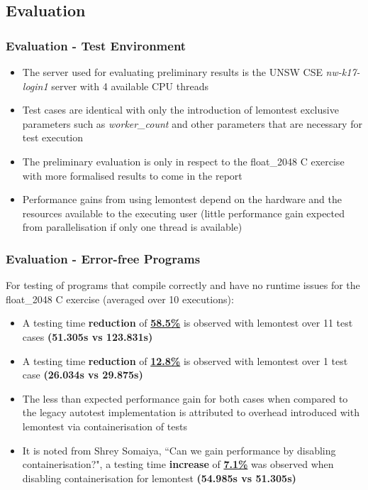 \documentclass[xcolor, handout]{beamer}
\begin{document}
\subsection{Evaluation}
\begin{frame}
	\frametitle{Evaluation - Test Environment}
	\begin{itemize}
		\setlength\itemsep{1em}
		\item The server used for evaluating preliminary results is the UNSW CSE \textit{nw-k17-login1} server with 4 available CPU threads
			\pause
		\item Test cases are identical with only the introduction of lemontest exclusive parameters such as \textit{worker\_count} and other parameters that are necessary for test execution
			\pause
		\item The preliminary evaluation is only in respect to the float\_2048 C exercise with more formalised results to come in the report
			\pause
		\item Performance gains from using lemontest depend on the hardware and the resources available to the executing user (little performance gain expected from parallelisation if only one thread is available)
	\end{itemize}
\end{frame}
\begin{frame}
	\frametitle{Evaluation - Error-free Programs}
	For testing of programs that compile correctly and have no runtime issues for the float\_2048 C exercise (averaged over 10 executions):\\
		\pause
	\begin{itemize}
		\setlength\itemsep{0.75em}
		\item A testing time \textbf{reduction} of \textbf{\underline{58.5\%}} is observed with lemontest over 11 test cases \textbf{(51.305s vs 123.831s)}
			\pause
		\item A testing time \textbf{reduction} of \textbf{\underline{12.8\%}} is observed with lemontest over 1 test case \textbf{(26.034s vs 29.875s)}
			\pause
		\item The less than expected performance gain for both cases when compared to the legacy autotest implementation is attributed to overhead introduced with lemontest via containerisation of tests
			\pause
		\item It is noted from Shrey Somaiya, ``Can we gain performance by disabling containerisation?", a testing time \textbf{increase} of \textbf{\underline{7.1\%}} was observed when disabling containerisation for lemontest \textbf{(54.985s vs 51.305s)}
	\end{itemize}
\end{frame}
\end{document}
